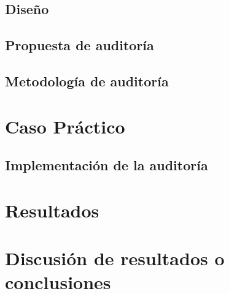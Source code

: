 \documentclass[a4paper, 10pt]{article}
\begin{document}
\subsection{Diseño}

\subsection{Propuesta de auditoría}

\subsection{Metodología de auditoría}

\clearpage


\section{Caso Práctico}

\subsection{Implementación de la auditoría}


\clearpage

\section{Resultados}



\clearpage

\section{Discusión de resultados o conclusiones}



\clearpage
\end{document}
